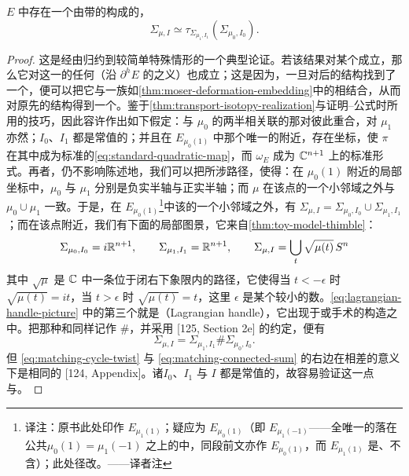 \begin{lemma}\label{thm:matching-concatenation-twist}
$E$ 中存在一个由带\trFrame{}的\trLagrange\trSphere{}构成的\trIsotopy，
\begin{equation}\label{eq:matching-cycle-twist}
\Sigma_{\mu,I}\simeq\tau_{\Sigma_{\mu_1,I_1}}(\Sigma_{\mu_0,I_0}).
\end{equation}
\end{lemma}
\begin{proof}
这是经由\trDeformation{}归约到较简单特殊情形的一个典型论证。若该结果对某个\trExact\trLefschetzFibration{}成立，那么它对这一\trFibration{}的任何\trDeformation{}（沿 $\partial^hE$ \trWellBehaved{}的\trDeformation{}之义）也成立；这是因为，一旦对\trDeformation{}后的\trLefschetzFibration{}结构找到了一个\trIsotopy，便可以把它与一族如\cref{thm:moser-deformation-embedding}中的\trConformallySymplectic{}\trEmbedding{}相结合，从而对原先的结构得到一个\trIsotopy。鉴于\cref{thm:transport-isotopy-realization}与证明\trPicard--\trLefschetz{}公式时所用的技巧，因此容许作出如下假定：与 $\mu_0$ 的两半相关联的那对\trVanishingCycle{}彼此重合，对 $\mu_1$ 亦然；\trIsotopy{}$I_0$、$I_1$ 都是常值的；并且在 $E_{\mu_0(1)}$ 中那个唯一的\trCriticalPoint{}附近，存在\trHolomorphic{}坐标，使 $\pi$ 在其中成为标准的\trQuadraticForm{}\eqref{eq:standard-quadratic-map}，而 $\omega_E$ 成为 $\mathbb{C}^{n+1}$ 上的标准\trKaehler{}形式。再者，仍不影响陈述地，我们可以把所涉路径\trDeformation，使得：在 $\mu_0(1)$ 附近的局部坐标中，$\mu_0$ 与 $\mu_1$ 分别是负实半轴与正实半轴；而 $\mu$ 在该点的一个小邻域之外与 $\mu_0\cup\mu_1$ 一致。于是，在 $E_{\mu_0(1)}$\footnote{译注：原书此处印作 $E_{\mu_1(1)}$；疑应为 $E_{\mu_0(1)}$（即 $E_{\mu_1(-1)}$——全\trFibration{}唯一的\trCriticalPoint{}落在公共\trCriticalValue{}$\mu_0(1)=\mu_1(-1)$ 之上的\trFiber{}中，同段前文亦作 $E_{\mu_0(1)}$，而 $E_{\mu_1(1)}$ 是\trRegular\trFiber、不含\trCriticalPoint）；此处径改。——译者注}中该\trCriticalPoint{}的一个小邻域之外，有 $\Sigma_{\mu,I}=\Sigma_{\mu_0,I_0}\cup\Sigma_{\mu_1,I_1}$；而在该点附近，我们有下面的局部图景，它来自\cref{thm:toy-model-thimble}：
\begin{equation}\label{eq:lagrangian-handle-picture}
\Sigma_{\mu_0,I_0}=i\mathbb{R}^{n+1},\qquad
\Sigma_{\mu_1,I_1}=\mathbb{R}^{n+1},\qquad
\Sigma_{\mu,I}=\bigcup_t\sqrt{\mu(t)}\,S^n
\end{equation}
其中 $\sqrt{\mu}$ 是 $\mathbb{C}$ 中一条位于闭右下象限内的\trSmooth\trEmbedding{}路径，它使得当 $t<-\epsilon$ 时 $\sqrt{\mu(t)}=it$，当 $t>\epsilon$ 时 $\sqrt{\mu(t)}=t$，这里 $\epsilon$ 是某个较小的数。\eqref{eq:lagrangian-handle-picture} 中的第三个\trSubmanifold{}就是\textbf{\trLagrange\trHandle}（Lagrangian handle），它出现于\trLagrange\trConnectedSum{}或\trLagrange{}手术的构造之中。把那种和同样记作 $\#$，并采用 [125, Section 2e] 的约定，便有
\begin{equation}\label{eq:matching-connected-sum}
\Sigma_{\mu,I}=\Sigma_{\mu_1,I_1}\#\Sigma_{\mu_0,I_0}.
\end{equation}
但 \eqref{eq:matching-cycle-twist} 与 \eqref{eq:matching-connected-sum} 的右边在相差\trLagrange\trIsotopy{}的意义下是相同的 [124, Appendix]。诸\trIsotopy{}$I_0$、$I_1$ 与 $I$ 都是常值的，故容易验证这一点与\trFrame{}\trCompatible。
\end{proof}
